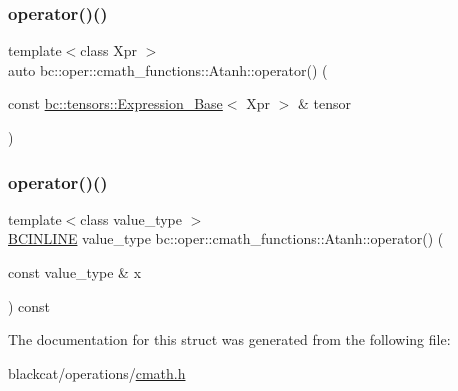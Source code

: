 \mbox{\label{structbc_1_1oper_1_1cmath__functions_1_1Atanh_af695ef95e7047389ff28c7685bee22d2}} 
\subsubsection{\texorpdfstring{operator()()}{operator()()}\hspace{0.1cm}{\footnotesize\ttfamily [2/3]}}
{\footnotesize\ttfamily template$<$class Xpr $>$ \\
auto bc\+::oper\+::cmath\+\_\+functions\+::\+Atanh\+::operator() (\begin{DoxyParamCaption}\item[{const \hyperlink{classbc_1_1tensors_1_1Expression__Base}{bc\+::tensors\+::\+Expression\+\_\+\+Base}$<$ Xpr $>$ \&}]{tensor }\end{DoxyParamCaption})\hspace{0.3cm}{\ttfamily [inline]}}

\mbox{\label{structbc_1_1oper_1_1cmath__functions_1_1Atanh_a945737670a9851de8649a39f545c9a3d}} 
\subsubsection{\texorpdfstring{operator()()}{operator()()}\hspace{0.1cm}{\footnotesize\ttfamily [3/3]}}
{\footnotesize\ttfamily template$<$class value\+\_\+type $>$ \\
\hyperlink{common_8h_a6699e8b0449da5c0fafb878e59c1d4b1}{B\+C\+I\+N\+L\+I\+NE} value\+\_\+type bc\+::oper\+::cmath\+\_\+functions\+::\+Atanh\+::operator() (\begin{DoxyParamCaption}\item[{const value\+\_\+type \&}]{x }\end{DoxyParamCaption}) const\hspace{0.3cm}{\ttfamily [inline]}}



The documentation for this struct was generated from the following file\+:\begin{DoxyCompactItemize}
\item 
blackcat/operations/\hyperlink{cmath_8h}{cmath.\+h}\end{DoxyCompactItemize}
